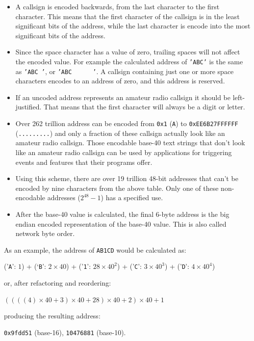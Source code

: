 \documentclass[a4paper,11pt,oneside]{book}
\begin{document}
\begin{itemize}
	\item
		A callsign is encoded backwards, from the last character to the first character. This means that the first character of the callsign is in the least significant bits of the address, while the last character is encode into the most significant bits of the address.
	\item
		Since the space character has a value of zero, trailing spaces will not affect the encoded value. For example the calculated address of \texttt{'ABC'} is the same as \texttt{'ABC~'}, or \texttt{'ABC~~~~~~'}. A callsign containing just one or more space characters encodes to an address of zero, and this address is reserved.
	\item
		If an uncoded address represents an amateur radio callsign it should be left-justified. That means that the first character will always be a digit or letter.
	\item
		Over 262 trillion address can be encoded from \texttt{0x1} (\texttt{A}) to \texttt{0xEE6B27FFFFFF} (\texttt{.........}) and only a fraction of these callsign actually look like an amateur radio callsign. Those encodable base-40 text strings that don't look like an amateur radio callsign can be used by applications for triggering events and features that their programs offer.
	\item
		Using this scheme, there are over 19 trillion 48-bit addresses that can't be encoded by nine characters from the above table. Only one of these non-encodable addresses ($2^{48}-1$) has a specified use.
	\item
		After the base-40 value is calculated, the final 6-byte address is the big endian encoded representation of the base-40 value. This is also called network byte order.
\end{itemize}

As an example, the address of \texttt{AB1CD} would be calculated as:

('\texttt{A}': $1$) + (`\texttt{B}': $2 \times 40$) + ('\texttt{1}': $28 \times 40^2$) + ('\texttt{C}': $3 \times 40^3$) + ('\texttt{D}': $4 \times 40^4$)

or, after refactoring and reordering:

$( ( ( ( 4 ) \times 40 + 3 ) \times 40 + 28 ) \times 40 + 2 ) \times 40 + 1$

producing the resulting address:

\texttt{0x9fdd51} (base-16), \texttt{10476881} (base-10).
\end{document}
